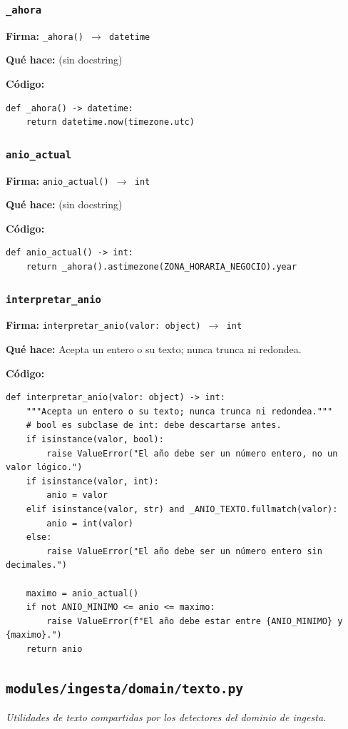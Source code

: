 \documentclass[11pt,a4paper]{article}
\begin{document}
\subsubsection*{\texttt{\_ahora}}
\textbf{Firma:} \texttt{\_ahora() $\rightarrow$ datetime}

\textbf{Qué hace:} (sin docstring)

\textbf{Código:}
\begin{lstlisting}
def _ahora() -> datetime:
    return datetime.now(timezone.utc)
\end{lstlisting}

\subsubsection*{\texttt{anio\_actual}}
\textbf{Firma:} \texttt{anio\_actual() $\rightarrow$ int}

\textbf{Qué hace:} (sin docstring)

\textbf{Código:}
\begin{lstlisting}
def anio_actual() -> int:
    return _ahora().astimezone(ZONA_HORARIA_NEGOCIO).year
\end{lstlisting}

\subsubsection*{\texttt{interpretar\_anio}}
\textbf{Firma:} \texttt{interpretar\_anio(valor: object) $\rightarrow$ int}

\textbf{Qué hace:} Acepta un entero o su texto; nunca trunca ni redondea.

\textbf{Código:}
\begin{lstlisting}
def interpretar_anio(valor: object) -> int:
    """Acepta un entero o su texto; nunca trunca ni redondea."""
    # bool es subclase de int: debe descartarse antes.
    if isinstance(valor, bool):
        raise ValueError("El año debe ser un número entero, no un valor lógico.")
    if isinstance(valor, int):
        anio = valor
    elif isinstance(valor, str) and _ANIO_TEXTO.fullmatch(valor):
        anio = int(valor)
    else:
        raise ValueError("El año debe ser un número entero sin decimales.")

    maximo = anio_actual()
    if not ANIO_MINIMO <= anio <= maximo:
        raise ValueError(f"El año debe estar entre {ANIO_MINIMO} y {maximo}.")
    return anio
\end{lstlisting}

\subsection{\texttt{modules/ingesta/domain/texto.py}}
\textit{Utilidades de texto compartidas por los detectores del dominio de ingesta.}
\end{document}
